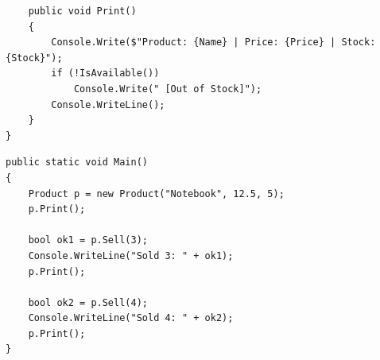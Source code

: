 \documentclass[14pt]{extarticle}
\begin{document}
\begin{enumerate}[itemsep=2em]
{\begin{boxSolution}
\begin{english}
\begin{verbatim}
    public void Print()
    {
        Console.Write($"Product: {Name} | Price: {Price} | Stock: {Stock}");
        if (!IsAvailable())
            Console.Write(" [Out of Stock]");
        Console.WriteLine();
    }
}
\end{verbatim}
\end{english}
\end{boxSolution}
\begin{boxSolution}
\begin{english}
\begin{verbatim}
public static void Main()
{
    Product p = new Product("Notebook", 12.5, 5);
    p.Print();

    bool ok1 = p.Sell(3);
    Console.WriteLine("Sold 3: " + ok1);
    p.Print();

    bool ok2 = p.Sell(4);
    Console.WriteLine("Sold 4: " + ok2);
    p.Print();
}
\end{verbatim}
\end{english}
\end{boxSolution}
}
\fi

\end{enumerate}
\end{document}
